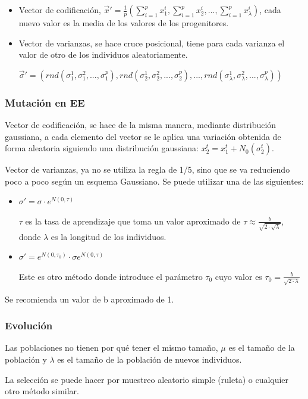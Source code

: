 \documentclass[12pt, twoside, openright]{report} %
\begin{document}
\begin{itemize}
	\item Vector de codificación, $\vec{x}'= \frac{1}{p}(\sum^p_{i=1}x_1^i,\sum^p_{i=1}x_2^i, ..., \sum^p_{i=1}x_\lambda^i)$, cada nuevo valor es la media de los valores de los progenitores.
	\item Vector de varianzas, se hace cruce posicional, tiene para cada varianza el valor de otro de los individuos aleatoriamente.
	
	$\vec{\sigma}'=(rnd(\sigma^1_1,\sigma^2_1, ..., \sigma^p_1), rnd(\sigma^1_2,\sigma^2_2, ..., \sigma^p_2), ..., rnd(\sigma^1_\lambda,\sigma^2_\lambda, ..., \sigma^p_\lambda))$
\end{itemize}

\subsubsection{Mutación en EE}
Vector de codificación, se hace de la misma manera, mediante distribución gaussiana, a cada elemento del vector se le aplica una variación obtenida de forma aleatoria siguiendo una distribución gaussiana: $x^t_2=x^t_1+N_0(\sigma^t_2)$.

Vector de varianzas, ya no se utiliza la regla de 1/5, sino que se va reduciendo poco a poco según un esquema Gaussiano. Se puede utilizar una de las siguientes: 
\begin{itemize}
	\item $\sigma'=\sigma \cdot e^{N(0,\tau)}$

	$\tau$ es la tasa de aprendizaje que toma un valor aproximado de $\tau \approx \frac{b}{\sqrt{2\cdot \sqrt{\lambda}}}$, donde $\lambda$ es la longitud de los individuos.
	\item $\sigma'=e^{N(0,\tau_0)}\cdot \sigma e^{N(0,\tau)}$
	
	Este es otro método donde introduce el parámetro $\tau_0$ cuyo valor es $\tau_0 = \frac{b}{\sqrt{2\cdot \lambda}}$
\end{itemize}

Se recomienda un valor de b aproximado de 1.

\subsubsection{Evolución}
Las poblaciones no tienen por qué tener el mismo tamaño, $\mu$ es el tamaño de la población y $\lambda$ es el tamaño de la población de nuevos individuos.

La selección se puede hacer por muestreo aleatorio simple (ruleta) o cualquier otro método similar.
\end{document}
